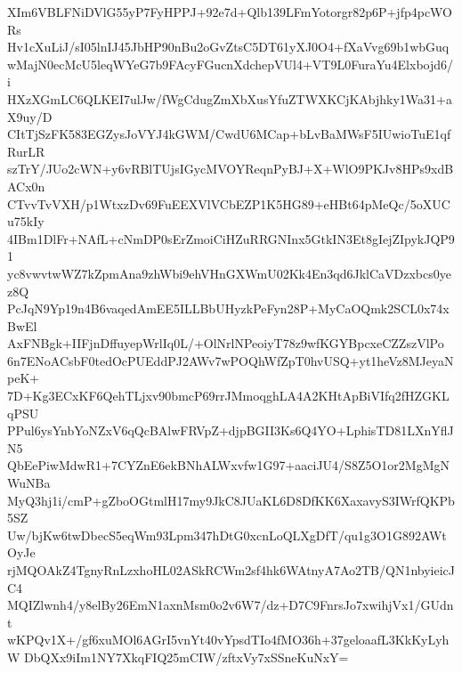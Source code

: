 XIm6VBLFNiDVlG55yP7FyHPPJ+92e7d+Qlb139LFmYotorgr82p6P+jfp4pcWORs
Hv1cXuLiJ/sI05lnIJ45JbHP90nBu2oGvZtsC5DT61yXJ0O4+fXaVvg69b1wbGuq
wMajN0ecMcU5leqWYeG7b9FAcyFGucnXdchepVUl4+VT9L0FuraYu4Elxbojd6/i
HXzXGmLC6QLKEI7ulJw/fWgCdugZmXbXusYfuZTWXKCjKAbjhky1Wa31+aX9uy/D
CItTjSzFK583EGZysJoVYJ4kGWM/CwdU6MCap+bLvBaMWsF5IUwioTuE1qfRurLR
szTrY/JUo2cWN+y6vRBlTUjsIGycMVOYReqnPyBJ+X+WlO9PKJv8HPs9xdBACx0n
CTvvTvVXH/p1WtxzDv69FuEEXVlVCbEZP1K5HG89+eHBt64pMeQc/5oXUCu75kIy
4IBm1DlFr+NAfL+cNmDP0sErZmoiCiHZuRRGNInx5GtkIN3Et8gIejZIpykJQP91
yc8vwvtwWZ7kZpmAna9zhWbi9ehVHnGXWmU02Kk4En3qd6JklCaVDzxbcs0yez8Q
PcJqN9Yp19n4B6vaqedAmEE5ILLBbUHyzkPeFyn28P+MyCaOQmk2SCL0x74xBwEl
AxFNBgk+IIFjnDffuyepWrlIq0L/+OlNrlNPeoiyT78z9wfKGYBpcxeCZZszVlPo
6n7ENoACsbF0tedOcPUEddPJ2AWv7wPOQhWfZpT0hvUSQ+yt1heVz8MJeyaNpeK+
7D+Kg3ECxKF6QehTLjxv90bmcP69rrJMmoqghLA4A2KHtApBiVIfq2fHZGKLqPSU
PPul6ysYnbYoNZxV6qQcBAlwFRVpZ+djpBGII3Ks6Q4YO+LphisTD81LXnYflJN5
QbEePiwMdwR1+7CYZnE6ekBNhALWxvfw1G97+aaciJU4/S8Z5O1or2MgMgNWuNBa
MyQ3hj1i/cmP+gZboOGtmlH17my9JkC8JUaKL6D8DfKK6XaxavyS3IWrfQKPb5SZ
Uw/bjKw6twDbecS5eqWm93Lpm347hDtG0xcnLoQLXgDfT/qu1g3O1G892AWtOyJe
rjMQOAkZ4TgnyRnLzxhoHL02ASkRCWm2sf4hk6WAtnyA7Ao2TB/QN1nbyieicJC4
MQIZlwnh4/y8elBy26EmN1axnMsm0o2v6W7/dz+D7C9FnrsJo7xwihjVx1/GUdnt
wKPQv1X+/gf6xuMOl6AGrI5vnYt40vYpsdTIo4fMO36h+37geloaafL3KkKyLyhW
DbQXx9iIm1NY7XkqFIQ25mCIW/zftxVy7xSSneKuNxY=

